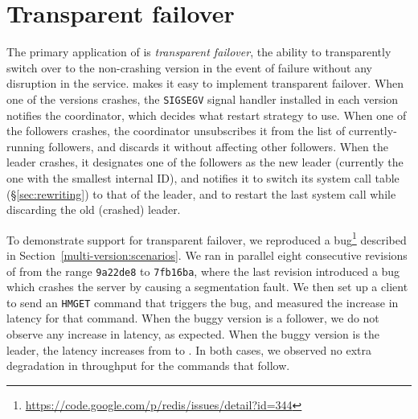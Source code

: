 \section{Transparent failover}
\label{sec:applications}


The primary application of \varan is \emph{transparent failover}, \ie the
ability to transparently switch over to the non-crashing version in the event
of failure without any disruption in the service.
\varan makes it easy to implement transparent failover.  When one of the
versions crashes, the \lstinline`SIGSEGV` signal handler installed in each
version notifies the coordinator, which decides what restart strategy to use.
When one of the followers crashes, the coordinator unsubscribes it from the
list of currently-running followers, and discards it without affecting other
followers.  When the leader crashes, it designates one of the followers as the
new leader (currently the one with the smallest internal ID), and notifies it
to switch its system call table (\S\ref{sec:rewriting}) to that of the leader,
and to restart the last system call while discarding the old (crashed) leader.


To demonstrate support for transparent failover, we reproduced a
\redis
bug\footnote{\url{https://code.google.com/p/redis/issues/detail?id=344}}
described in Section~\ref{multi-version:scenarios}.  We ran in
parallel eight consecutive revisions of \redis from the range
\lstinline`9a22de8` to \lstinline`7fb16ba`, where the last revision
introduced a bug which crashes the server by causing a segmentation
fault. We then set up a client to send an \lstinline`HMGET` command
that triggers the bug, and measured the increase in latency for that
command.  When the buggy version is a follower, we do not observe any
increase in latency, as expected.  When the buggy version is the leader,
the latency increases from \redisnormallatency to
\redisfailoverlatency.  In both cases, we observed no extra
degradation in throughput for the commands that follow.

